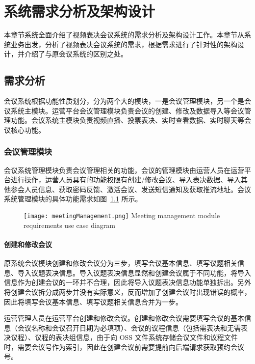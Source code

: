 
\chapter{系统需求分析及架构设计}
本章节系统全面介绍了视频表决会议系统的需求分析及架构设计工作。本章节从系统业务出发，分析了视频表决会议系统的需求，根据需求进行了针对性的架构设计，并介绍了与原会议系统的区别之处。

\section{需求分析}

会议系统根据功能性质划分，分为两个大的模块，一是会议管理模块，另一个是会议系统主模块。运营平台会议管理模块负责会议的创建、修改及数据导入等会议管理功能。会议系统主模块负责视频直播、投票表决、实时查看数据、实时聊天等会议核心功能。

\subsection{会议管理模块}

会议系统管理模块负责会议管理相关的功能，会议的管理模块由运营人员在运营平台进行操作，运营人员具有的功能权限有创建/修改会议、导入表决数据、导入其他参会人员信息、获取密码反馈、激活会议、发送短信通知及获取推流地址。会议系统管理模块的具体功能需求如图~\ref{fig:meetingManagement} 所示。

\begin{figure}[!htp]
  \centering
  \texttt{[image: meetingManagement.png]}
    {Meeting management module requirements use case diagram}
 \label{fig:meetingManagement}
\end{figure}

\subsubsection{创建和修改会议}
原系统会议模块创建和修改会议分为三步，填写会议基本信息、填写议题相关信息、导入议题表决信息。导入议题表决信息显然和创建会议属于不同功能，将导入信息作为创建会议的一环并不合理，因此将导入议题表决信息功能单独拆出。另外将创建会议拆分成两步并没有实际意义，反而增加了创建会议时出现错误的概率，因此将填写会议基本信息、填写议题相关信息合并为一步。

运营管理人员在运营平台创建和修改会议。创建和修改会议需要填写会议的基本信息（会议名称和会议召开日期为必填项）、会议的议程信息（包括需表决和无需表决议程）、议程的表决组信息，由于向 OSS 文件系统存储会议文件和议程文件时，需要会议号作为索引，因此在创建会议前需要提前向后端请求获取预约会议号。

